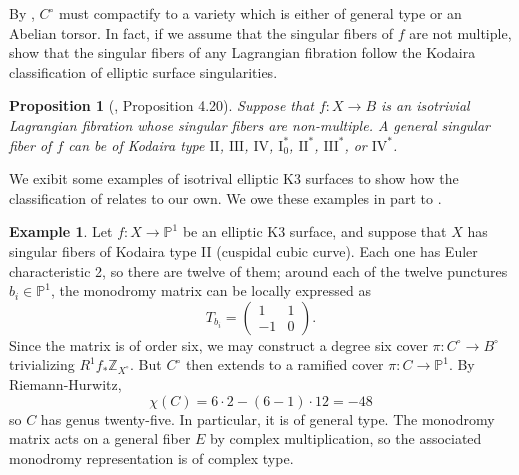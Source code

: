 \documentclass[12pt]{amsart}
\newcommand{\Z}{\mathbb{Z}}
\newtheorem{proposition}[theorem]{Proposition}
\theoremstyle{definition}
\newtheorem{example}[theorem]{Example}
\theoremstyle{remark}
\numberwithin{equation}{section}
\begin{document}
By \cite{kim-laza-martin23}, $C^\circ$ must compactify to a variety which is either
of general type or an Abelian torsor.
In fact, if we assume that the singular fibers of \(f\) are not multiple, 
\cite{kim-laza-martin23} show that the singular fibers of any Lagrangian
fibration follow the Kodaira classification of elliptic surface singularities.

\begin{proposition}[\cite{kim-laza-martin23}, Proposition 4.20] \label{klm-kodaira-type}
    Suppose that \(f: X \to B\) is an isotrivial Lagrangian fibration whose 
    singular fibers are non-multiple. A general singular fiber of \(f\) can be
    of Kodaira type \(\mathrm{II}\), \(\mathrm{III}\), \(\mathrm{IV}\), \(\mathrm{I}_0^*\),
    \(\mathrm{II}^*\), \(\mathrm{III}^*\), or \(\mathrm{IV}^*\).
\end{proposition}

We exibit some examples of isotrival elliptic K3 surfaces
to show how the classification of \cite{kim-laza-martin23} relates to our own.
We owe these examples in part to \cite{sawon14}.

\begin{example}
Let \(f: X \to \mathbb{P}^1\) be an elliptic K3 surface, and suppose
that \(X\) has singular fibers of Kodaira type II (cuspidal cubic curve). Each one
has Euler characteristic 2, so there are twelve of them; around each of the twelve
punctures \(b_i \in \mathbb{P}^1\), the monodromy matrix can be locally expressed as
\begin{equation}
    T_{b_i} = \begin{pmatrix}
        1 & 1 \\ -1 & 0
    \end{pmatrix}.
\end{equation}
Since the matrix is of order six, we may construct a degree six cover 
\(\pi: C^\circ \to B^\circ\) trivializing \(R^1 f_* \Z_{X^\circ}\).
But \(C^\circ\) then extends to a ramified cover \(\pi: C \to \mathbb{P}^1\).
By Riemann-Hurwitz, 
\begin{equation}
    \chi(C) = 6 \cdot 2 - (6-1) \cdot 12 = -48
\end{equation}
so \(C\) has genus twenty-five. In particular, it is of general type. The monodromy matrix
acts on a general fiber \(E\) by complex multiplication, so the associated
monodromy representation is of complex type.
\end{example}
\end{document}
